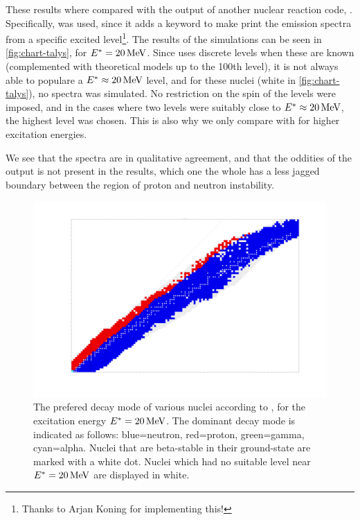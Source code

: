 These results where compared with the output of another nuclear reaction code, \cite{talys:2015}. Specifically,  was used, since it adds a keyword to make  print the emission spectra from a specific excited level\footnote{Thanks to Arjan Koning for implementing this!}. 
The results of the  simulations can be seen in \autoref{fig:chart-talys}, for $E^*=\unit[20]{MeV}$. Since  uses discrete levels when these are known (complemented with theoretical models up to the 100th level\cite{talys:2015}), it is not always able to populare a $E^*\approx\unit[20]{MeV}$ level, and for these nuclei (white in \autoref{fig:chart-talys}), no spectra was simulated. No restriction on the spin of the levels were imposed, and in the cases where two levels were suitably close to $E^*\approx\unit[20]{MeV}$, the highest level was chosen. This is also why we only compare with  for higher excitation energies.

We see that the spectra are in qualitative agreement, and that the oddities of the \codename{} output is not present in the  results, which one the whole has a less jagged boundary between the region of proton and neutron instability.
\begin{figure}
\begin{center}
\includegraphics[width=\textwidth]{figures/spectra/talys-20-spectra.pdf}
\caption{\label{fig:chart-talys} The prefered decay mode of various nuclei according to , for the excitation energy $E^*=\unit[20]{MeV}$. The dominant decay mode is indicated as follows: blue=neutron, red=proton, green=gamma, cyan=alpha. Nuclei that are beta-stable in their ground-state are marked with a white dot. Nuclei which had no suitable level near $E^*=\unit[20]{MeV}$ are displayed in white.}
\end{center}
\end{figure}

